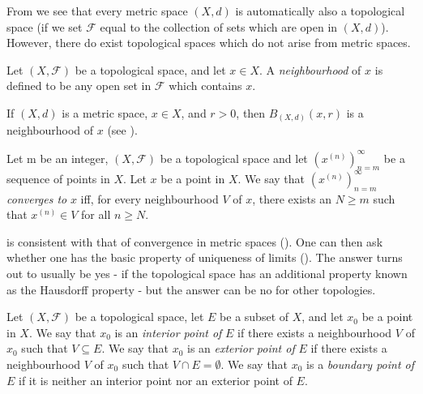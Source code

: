 \begin{note}
  From  we see that every metric space \((X, d)\) is automatically also a topological space
  (if we set \(\mathcal{F}\) equal to the collection of sets which are open in \((X, d)\)).
  However, there do exist topological spaces which do not arise from metric spaces.
\end{note}

\begin{defn}[Neighbourhoods]\label{ii:2.5.2}
  Let \((X, \mathcal{F})\) be a topological space, and let \(x \in X\).
  A \emph{neighbourhood} of \(x\) is defined to be any open set in \(\mathcal{F}\) which contains \(x\).
\end{defn}

\begin{eg}\label{ii:2.5.3}
  If \((X, d)\) is a metric space, \(x \in X\), and \(r > 0\), then \(B_{(X, d)}(x, r)\) is a neighbourhood of \(x\) (see ).
\end{eg}

\begin{defn}\label{ii:2.5.4}
  Let m be an integer, \((X, \mathcal{F})\) be a topological space and let \((x^{(n)})_{n = m}^\infty\) be a sequence of points in \(X\).
  Let \(x\) be a point in \(X\).
  We say that \((x^{(n)})_{n = m}^\infty\) \emph{converges to} \(x\) iff, for every neighbourhood \(V\) of \(x\), there exists an \(N \geq m\) such that \(x^{(n)} \in V\) for all \(n \geq N\).
\end{defn}

\begin{note}
   is consistent with that of convergence in metric spaces ().
  One can then ask whether one has the basic property of uniqueness of limits ().
  The answer turns out to usually be yes
  - if the topological space has an additional property known as the Hausdorff property
  - but the answer can be no for other topologies.
\end{note}

\begin{defn}\label{ii:2.5.5}
  Let \((X, \mathcal{F})\) be a topological space, let \(E\) be a subset of \(X\), and let \(x_0\) be a point in \(X\).
  We say that \(x_0\) is an \emph{interior point of} \(E\) if there exists a neighbourhood \(V\) of \(x_0\) such that \(V \subseteq E\).
  We say that \(x_0\) is an \emph{exterior point of} \(E\) if there exists a neighbourhood \(V\) of \(x_0\) such that \(V \cap E = \emptyset\).
  We say that \(x_0\) is a \emph{boundary point of} \(E\) if it is neither an interior point nor an exterior point of \(E\).
\end{defn}

